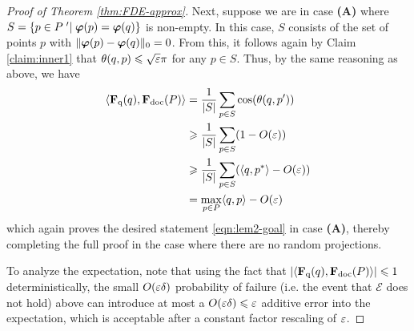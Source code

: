 \begin{proof}[Proof of Theorem \ref{thm:FDE-approx}]
 Next, suppose we are in case \textbf{(A)} where $S = \{p \in P \;' | \; \boldsymbol{\varphi}(p) = \boldsymbol{\varphi}(q)\}$ is non-empty. In this case, $S$ consists of the set of points $p$ with $\|\boldsymbol{\varphi}(p) - \boldsymbol{\varphi}(q)\|_0 = 0$. From this, it follows again by Claim \ref{claim:inner1} that $\theta(q,p) \leqslant \sqrt{\varepsilon} \pi$ for any $p \in S$. Thus, by the same reasoning as above, we have
 \begin{equation}
     \begin{split}
         \langle \mathbf{F}_{\text{q}}(q) , \mathbf{F}_{\text{doc}}(P)\rangle &=  \frac{1}{|S|}\sum_{p \in S}\cos(\theta(q,p')) \\
         & \geqslant \frac{1}{|S|}\sum_{p \in S}(1-O(\varepsilon))\\
         & \geqslant \frac{1}{|S|}\sum_{p \in S}( \langle q,p^*\rangle -O(\varepsilon))\\ 
         & =\max_{p \in P} \langle q,p\rangle   - O(\varepsilon) \\
     \end{split}
 \end{equation} 
 which again proves the desired statement \ref{eqn:lem2-goal} in case \textbf{(A)}, thereby completing the full proof in the case where there are no random projections.
 
 To analyze the expectation, note that using the fact that $| \langle \mathbf{F}_{\text{q}}(q) , \mathbf{F}_{\text{doc}}(P)\rangle| \leqslant 1$ deterministically, the small $O(\varepsilon \delta)$ probability of failure (i.e. the event that $\mathcal{E}$ does not hold) above can introduce at most a $O(\varepsilon \delta) \leqslant \varepsilon$  additive error into the expectation, which is acceptable after a constant factor rescaling of $\varepsilon$.
 

\end{proof}
